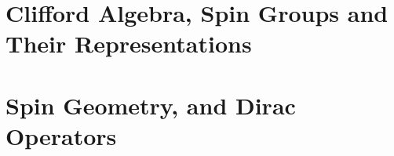 \documentclass[Total.tex]{subfiles}
\begin{document}
	\chapter{Clifford Algebra, Spin Groups and Their Representations}
	
	\chapter{Spin Geometry, and Dirac Operators}
\end{document}
